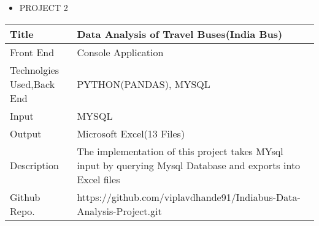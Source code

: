 \documentclass[a4paper,10pt]{article}
\begin{document}
 
 
 
\vspace{10mm}

 
 \renewcommand{\labelitemi}{$\blacksquare$}
 
 
 \begin{itemize}
   \item {\large PROJECT 2}
   
 \end{itemize}


\begin{tabu} to 0.9\textwidth { | X[l] | X[2.5] | }
 \hline
 \large Title & Data Analysis of Travel Buses(India Bus)\\
 
 \hline
\large Front End  & Console Application\\
 

 \hline
 \large Technolgies Used,Back End    & PYTHON(PANDAS), MYSQL \\
 
 \hline
\large Input  & MYSQL   \\


\hline
\large Output  & Microsoft Excel(13 Files)   \\
 
 \hline
\large Description & The implementation of this project takes MYsql input by querying Mysql Database and exports into Excel files \\


\hline
\large Github Repo. & https://github.com/viplavdhande91/Indiabus-Data-Analysis-Project.git \\
 
 
\hline
 

 
\hline
\end{tabu}
 
 
 
 
 
 
 
 
 
 
 
 
 
 
 
 
 
 
 
 
 
 
 
 
 
 
 
 
 
 
 
\end{document}
